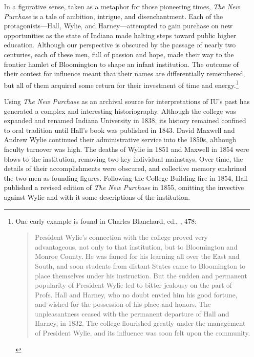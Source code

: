 \documentclass[
  american,
  letterpaper,
]{scrreprt}
\begin{document}
In a figurative sense, taken as a metaphor for those pioneering times,
\emph{The New Purchase} is a tale of ambition, intrigue, and
disenchantment. Each of the protagonists---Hall, Wylie, and
Harney---attempted to gain purchase on new opportunities as the state of
Indiana made halting steps toward public higher education. Although our
perspective is obscured by the passage of nearly two centuries, each of
these men, full of passion and hope, made their way to the frontier
hamlet of Bloomington to shape an infant institution. The outcome of
their contest for influence meant that their names are differentially
remembered, but all of them acquired some return for their investment of
time and energy.\footnote{One early example is found in Charles
  Blanchard, ed., , 478:

  \begin{quote}
  President Wylie's connection with the college proved very
  advantageous, not only to that institution, but to Bloomington and
  Monroe County. He was famed for his learning all over the East and
  South, and soon students from distant States came to Bloomington to
  place themselves under his instruction. But the sudden and permanent
  popularity of President Wylie led to bitter jealousy on the part of
  Profs. Hall and Harney, who no doubt envied him his good fortune, and
  wished for the possession of his place and honors. The unpleasantness
  ceased with the permanent departure of Hall and Harney, in 1832. The
  college flourished greatly under the management of President Wylie,
  and its influence was soon felt upon the community.
  \end{quote}}

Using \emph{The New Purchase} as an archival source for interpretations
of IU's past has generated a complex and interesting historiography.
Although the college was expanded and renamed Indiana University in
1838, its history remained confined to oral tradition until Hall's book
was published in 1843. David Maxwell and Andrew Wylie continued their
administrative service into the 1850s, although faculty turnover was
high. The deaths of Wylie in 1851 and Maxwell in 1854 were blows to the
institution, removing two key individual mainstays. Over time, the
details of their accomplishments were obscured, and collective memory
enshrined the two men as founding figures. Following the College
Building fire in 1854, Hall published a revised edition of \emph{The New
Purchase} in 1855, omitting the invective against Wylie and with it some
descriptions of the institution.
\end{document}
